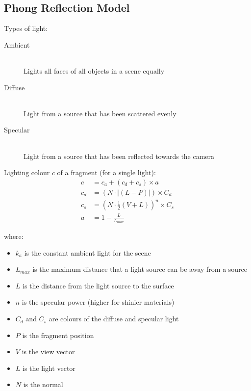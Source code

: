 \documentclass[a4paper]{article}
\begin{document}
\subsection{Phong Reflection Model}

Types of light:

\begin{description}
  \item[Ambient] \hfill \\
    Lights all faces of all objects in a scene equally

  \item[Diffuse] \hfill \\
    Light from a source that has been scattered evenly

  \item[Specular] \hfill \\
    Light from a source that has been reflected towards the camera

\end{description}

Lighting colour $c$ of a fragment (for a single light):
\begin{align*}
  c &= c_{a} + (c_{d} + c_{s}) \times a \\
  c_{d} &= (N \cdot |(L - P)|) \times C_{d} \\
  c_{s} &= (N \cdot \frac{1}{2}(V + L))^{n} \times C_{s}\\
  a &= 1 - \frac{L}{L_{max}}
\end{align*}

where:

\begin{itemize}
  \item
    $k_{a}$ is the constant ambient light for the scene

  \item
    $L_{max}$ is the maximum distance that a light source can be away from a
    source

  \item
    $L$ is the distance from the light source to the surface

  \item
    $n$ is the specular power (higher for shinier materials)

  \item
    $C_{d}$ and $C_{s}$ are colours of the diffuse and specular light

  \item
    $P$ is the fragment position

  \item
    $V$ is the view vector

  \item
    $L$ is the light vector

  \item
    $N$ is the normal

\end{itemize}
\end{document}
